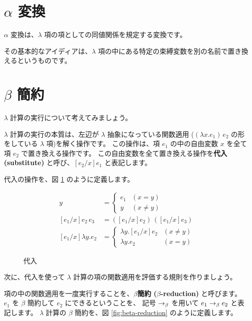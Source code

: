 \section{$\alpha$ 変換}

$\alpha$ 変換は、$\lambda$ 項の項としての同値関係を規定する変換です。

その基本的なアイディアは、$\lambda$ 項の中にある特定の束縛変数を別の名前で置き換えるというものです。

\section{$\beta$ 簡約}

$\lambda$ 計算の実行について考えてみましょう。

$\lambda$ 計算の実行の本質は、左辺が $\lambda$ 抽象になっている関数適用
($(\lambda x . e_1) \, e_2$ の形をしている $\lambda$ 項)を解く操作です。
この操作は、項 $e_1$ の中の自由変数 $x$ を全て項 $e_2$ で置き換える操作です。
この自由変数を全て置き換える操作を\textbf{代入 (substitute)} と呼び、$[e_2/x] e_1$ と表記します。

代入の操作を、図 \ref{fig:lambda-substitute} のように定義します。

\begin{figure}[htbp]
  \begin{align*}
    [e_1/x] y & = \left \{
      \begin{array}{ll}
        e_1 & (x = y) \\
        y & (x \neq y)
      \end{array}
      \right. \\
    [e_1/x] e_2 \, e_3 & = ([e_1/x] e_2) \, ([e_1/x] e_3) \\
    [e_1/x] \lambda y . e_2 & = \left \{
      \begin{array}{ll}
        \lambda y . [e_1/x] e_2 & (x \neq y) \\
        \lambda y . e_2 & (x = y)
      \end{array}
      \right.
  \end{align*}
  \caption{代入}
  \label{fig:lambda-substitute}
\end{figure}

次に、代入を使って $\lambda$ 計算の項の関数適用を評価する規則を作りましょう。

項の中の関数適用を一度実行することを、\textbf{$\beta$簡約 ($\beta$-reduction)} と呼びます。
$e_1$ を $\beta$ 簡約して $e_2$ にできるということを、
記号 $\to_\beta$ を用いて $e_1 \to_\beta e_2$ と表記します。
$\lambda$ 計算の $\beta$ 簡約を、図 \ref{fig:beta-reduction} のように定義します。

